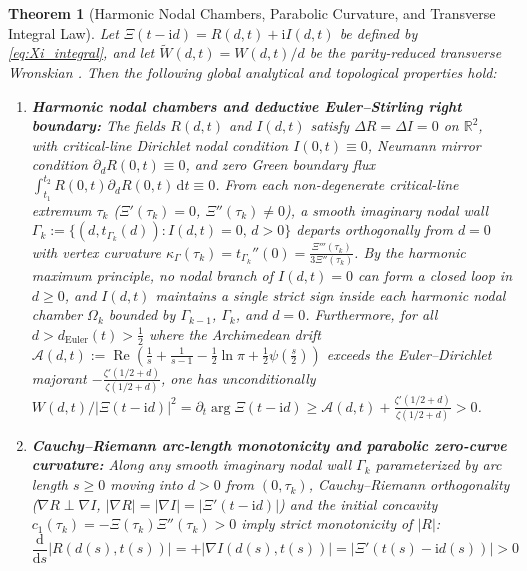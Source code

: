 \documentclass[11pt,a4paper,reqno]{amsart}
\newtheorem{theorem}{Theorem}[section]
\theoremstyle{definition}
\theoremstyle{remark}
\numberwithin{equation}{section}
\newcommand{\dd}{\mathrm{d}}
\newcommand{\ii}{\mathrm{i}}
\newcommand{\Rea}{\operatorname{Re}}
\newcommand{\Wtil}{\widetilde{W}}
\begin{document}
\begin{theorem}[Harmonic Nodal Chambers, Parabolic Curvature, and Transverse Integral Law]\label{thm:main}
Let $\Xi(t-\ii d) = R(d,t) + \ii I(d,t)$ be defined by \eqref{eq:Xi_integral}, and let $\Wtil(d,t) = W(d,t)/d$ be the parity-reduced transverse Wronskian \cite{Missiaen2026Paper2}. Then the following global analytical and topological properties hold:
\begin{enumerate}
\item[\textup{(i)}] \textbf{Harmonic nodal chambers and deductive Euler--Stirling right boundary:} The fields $R(d,t)$ and $I(d,t)$ satisfy $\Delta R = \Delta I = 0$ on $\mathbb{R}^2$, with critical-line Dirichlet nodal condition $I(0,t) \equiv 0$, Neumann mirror condition $\partial_d R(0,t) \equiv 0$, and zero Green boundary flux $\int_{t_1}^{t_2} R(0,t)\partial_d R(0,t)\,\dd t \equiv 0$. From each non-degenerate critical-line extremum $\tau_k$ ($\Xi'(\tau_k) = 0$, $\Xi''(\tau_k) \neq 0$), a smooth imaginary nodal wall $\Gamma_k := \{(d,t_{\Gamma_k}(d)) : I(d,t) = 0,\, d > 0\}$ departs orthogonally from $d = 0$ with vertex curvature $\kappa_\Gamma(\tau_k) = t_{\Gamma_k}''(0) = \frac{\Xi'''(\tau_k)}{3\Xi''(\tau_k)}$. By the harmonic maximum principle, no nodal branch of $I(d,t) = 0$ can form a closed loop in $d \ge 0$, and $I(d,t)$ maintains a single strict sign inside each harmonic nodal chamber $\Omega_k$ bounded by $\Gamma_{k-1}$, $\Gamma_k$, and $d = 0$. Furthermore, for all $d > d_{\mathrm{Euler}}(t) > \frac{1}{2}$ where the Archimedean drift $\mathcal{A}(d,t) := \Rea(\frac{1}{s} + \frac{1}{s-1} - \frac{1}{2}\ln\pi + \frac{1}{2}\psi(\frac{s}{2}))$ exceeds the Euler--Dirichlet majorant $-\frac{\zeta'(1/2+d)}{\zeta(1/2+d)}$, one has unconditionally $W(d,t)/|\Xi(t-\ii d)|^2 = \partial_t\arg\Xi(t-\ii d) \ge \mathcal{A}(d,t) + \frac{\zeta'(1/2+d)}{\zeta(1/2+d)} > 0$.
\item[\textup{(ii)}] \textbf{Cauchy--Riemann arc-length monotonicity and parabolic zero-curve curvature:} Along any smooth imaginary nodal wall $\Gamma_k$ parameterized by arc length $s \ge 0$ moving into $d > 0$ from $(0,\tau_k)$, Cauchy--Riemann orthogonality ($\nabla R \perp \nabla I$, $|\nabla R| = |\nabla I| = |\Xi'(t-\ii d)|$) and the initial concavity $c_1(\tau_k) = -\Xi(\tau_k)\Xi''(\tau_k) > 0$ imply strict monotonicity of $|R|$:
\begin{equation}\label{eq:cr_monotone_thm}
\frac{\dd}{\dd s}\big|R(d(s), t(s))\big| = +\big|\nabla I(d(s), t(s))\big| = \big|\Xi'(t(s) - \ii d(s))\big| > 0
\end{equation}

\end{enumerate}
\end{theorem}
\end{document}
